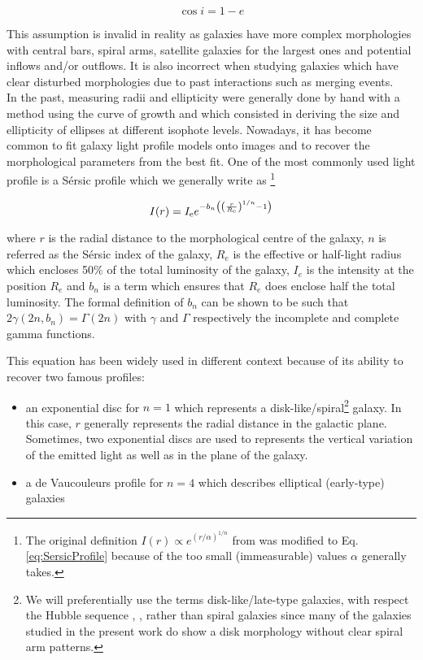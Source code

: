 \begin{equation}
	\cos i = 1 - e
	\label{eq:inclinaison}
\end{equation}

This assumption is invalid in reality as galaxies have more complex morphologies with central bars, spiral arms, satellite galaxies for the largest ones and potential inflows and/or outflows. It is also incorrect when studying galaxies which have clear disturbed morphologies due to past interactions such as merging events.  \\

In the past, measuring radii and ellipticity were generally done by hand with a method using the curve of growth and which consisted in deriving the size and ellipticity of ellipses at different isophote levels. Nowadays, it has become common to fit galaxy light profile models onto images and to recover the morphological parameters from the best fit. One of the most commonly used light profile is a Sérsic profile which we generally write as \footnote{The original definition $I(r) \propto e^{(r/\alpha)^{1/n}}$ from  was modified to Eq.\,\ref{eq:SersicProfile} because of the too small (immeasurable) values $\alpha$ generally takes.} 

\begin{equation}
    \label{eq:SersicProfile}
    I(r) = I_{\rm{e}} e^{ - b_n \left ( \left  ( \frac{r}{R_{\rm{e}}}  \right )^{1/n} - 1 \right ) }
\end{equation}

where $r$ is the radial distance to the morphological centre of the galaxy, $n$ is referred as the Sérsic index of the galaxy, $R_e$ is the effective or half-light radius which encloses 50\% of the total luminosity of the galaxy, $I_e$ is the intensity at the position $R_e$ and $b_n$ is a term which ensures that $R_e$ does enclose half the total luminosity. The formal definition of $b_n$ can be shown to be such that $2 \gamma (2n, b_n) = \Gamma (2n)$ with $\gamma$ and $\Gamma$ respectively the incomplete and complete gamma functions.

This equation has been widely used in different context because of its ability to recover two famous profiles:

\begin{itemize}
    \item an exponential disc for $n = 1$ which represents a disk-like/spiral\footnote{We will preferentially use the terms disk-like/late-type galaxies, with respect the Hubble sequence ,  , rather than spiral galaxies since many of the galaxies studied in the present work do show a disk morphology without clear spiral arm patterns.} galaxy. In this case, $r$ generally represents the radial distance in the galactic plane. Sometimes, two exponential discs are used to represents the vertical variation of the emitted light as well as in the plane of the galaxy. 
    \item a de Vaucouleurs profile for $n = 4$ which describes elliptical (early-type) galaxies
\end{itemize}


